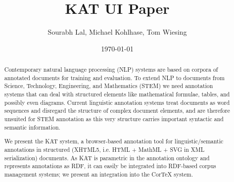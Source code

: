 \documentclass[11pt]{article}
\title{KAT UI Paper}
\author{Sourabh Lal, Michael Kohlhase, Tom Wiesing}
\date{\today}
\begin{document}
\maketitle

\begin{abstract}
  Contemporary natural language processing (NLP) systems are based on corpora of annotated
  documents for training and evaluation. To extend NLP to documents from Science,
  Technology, Engineering, and Mathematics (STEM) we need annotation systems that can deal
  with structured elements like mathematical formulae, tables, and possibly even
  diagrams. Current linguistic annotation systems treat documents as word sequences and
  disregard the structure of complex document elements, and are therefore unsuited for
  STEM annotation as this very structure carries important syntactic and semantic
  information.

  We present the KAT system, a browser-based annotation tool for linguistic/semantic
  annotations in structured (XHTML5, i.e. HTML + MathML + SVG in XML serialization)
  documents. As KAT is parametric in the annotation ontology and represents annotations as
  RDF, it can easily be integrated into RDF-based corpus management systems; we present an
  integration into the CorTeX system.
\end{abstract}

\newpage

\tableofcontents

\newpage



\newpage



\newpage



\newpage



\newpage



\newpage



\newpage



\newpage

{}
\end{document}
